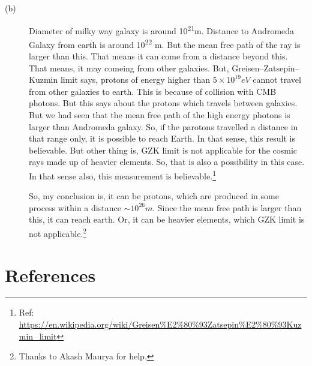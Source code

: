 \documentclass[a4paper,12pt]{article}
\begin{document}
\begin{description}
\item[{(b)}] Diameter of milky way galaxy is around 10\textsuperscript{21}m. Distance to Andromeda Galaxy from earth is around 10\textsuperscript{22} m. But the mean free path of the ray is larger than this. That means it can come from a distance beyond this. That means, it may comeing from other galaxies. But, Greisen–Zatsepin–Kuzmin limit says, protons of energy higher than \(5\times 10^{19} eV\) cannot travel from other galaxies to earth. This is because of collision with CMB photons. But this says about the protons which travels between galaxies. But we had seen that the mean free path of the high energy photons is larger than Andromeda galaxy. So, if the parotons travelled a distance in that range only, it is possible to reach Earth. In that sense, this result is believable. But other thing is, GZK limit is not applicable for the cosmic rays made up of heavier elements. So, that is also a possibility in this case. In that sense also, this measurement is believable.\footnote{Ref: \url{https://en.wikipedia.org/wiki/Greisen\%E2\%80\%93Zatsepin\%E2\%80\%93Kuzmin\_limit}}

So, my conclusion is, it can be protons, which are produced in some process within a distance \(\sim 10^{26}m\). Since the mean free path is larger than this, it can reach earth. Or, it can be heavier elements, which GZK limit is not applicable.\footnote{Thanks to Akash Maurya for help.}
\end{description}

\section*{References}
\label{sec:org8254fdb}


\end{document}
